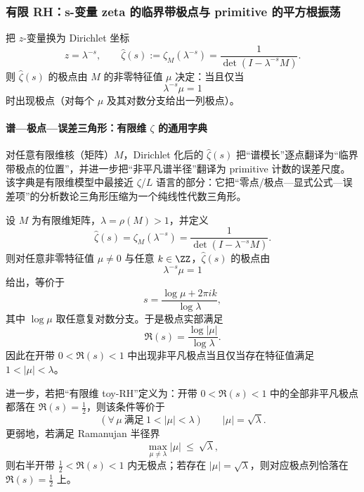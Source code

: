 \subsubsection{有限 RH：s-变量 zeta 的临界带极点与 primitive 的平方根振荡}\label{app:real-input-40-finite-rh}
把 $z$-变量换为 Dirichlet 坐标
\[
z=\lambda^{-s},\qquad \widehat{\zeta}(s):=\zeta_M(\lambda^{-s})=\frac{1}{\det(I-\lambda^{-s}M)}.
\]
则 $\widehat{\zeta}(s)$ 的极点由 $M$ 的非零特征值 $\mu$ 决定：当且仅当
\[
\lambda^{-s}\mu=1
\]
时出现极点（对每个 $\mu$ 及其对数分支给出一列极点）。

\paragraph{谱—极点—误差三角形：有限维 \texorpdfstring{$\zeta$}{zeta} 的通用字典}
对任意有限维核（矩阵）$M$，Dirichlet 化后的 $\widehat{\zeta}(s)$ 把“谱模长”逐点翻译为“临界带极点的位置”，并进一步把“非平凡谱半径”翻译为 primitive 计数的误差尺度。
该字典是有限维模型中最接近 \(\zeta\)/\(L\) 语言的部分：它把“零点/极点—显式公式—误差项”的分析数论三角形压缩为一个纯线性代数三角形。

\begin{proposition}\label{prop:finite-rh-triangle-dict}
设 $M$ 为有限维矩阵，$\lambda=\rho(M)>1$，并定义
\[
\widehat{\zeta}(s)=\zeta_M(\lambda^{-s})=\frac{1}{\det(I-\lambda^{-s}M)}.
\]
则对任意非零特征值 $\mu\neq 0$ 与任意 $k\in\ZZ$，$\widehat{\zeta}(s)$ 的极点由
\[
\lambda^{-s}\mu=1
\]
给出，等价于
\[
s=\frac{\log\mu+2\pi i k}{\log\lambda},
\]
其中 $\log\mu$ 取任意复对数分支。于是极点实部满足
\[
\Re(s)=\frac{\log|\mu|}{\log\lambda}.
\]
因此在开带 $0<\Re(s)<1$ 中出现非平凡极点当且仅当存在特征值满足 $1<|\mu|<\lambda$。

进一步，若把“有限维 toy-RH”定义为：开带 $0<\Re(s)<1$ 中的全部非平凡极点都落在 $\Re(s)=\tfrac12$，则该条件等价于
\[
(\forall\,\mu\ \text{满足}\ 1<|\mu|<\lambda)\qquad |\mu|=\sqrt{\lambda}.
\]
更弱地，若满足 Ramanujan 半径界
\[
\max_{\mu\neq\lambda}|\mu|\ \le\ \sqrt{\lambda},
\]
则右半开带 $\tfrac12<\Re(s)<1$ 内无极点；若存在 $|\mu|=\sqrt{\lambda}$，则对应极点列恰落在 $\Re(s)=\tfrac12$ 上。
\end{proposition}

